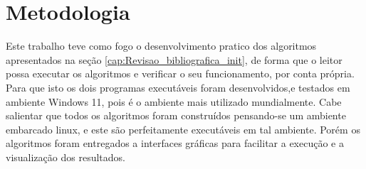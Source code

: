 \chapter{Metodologia}
\label{cap:Metodologia_init}

Este trabalho teve como fogo o desenvolvimento pratico dos algoritmos apresentados na seção \ref{cap:Revisao_bibliografica_init},
de forma que o leitor possa executar os algoritmos e verificar o seu funcionamento, por conta própria.
Para que isto os dois programas executáveis foram desenvolvidos,e testados em ambiente Windows 11, pois é o ambiente mais utilizado mundialmente.
Cabe salientar que todos os algoritmos foram construídos pensando-se um ambiente embarcado linux, e este são perfeitamente executáveis em tal ambiente.
Porém os algoritmos foram entregados a interfaces gráficas para facilitar a execução e a visualização dos resultados.
